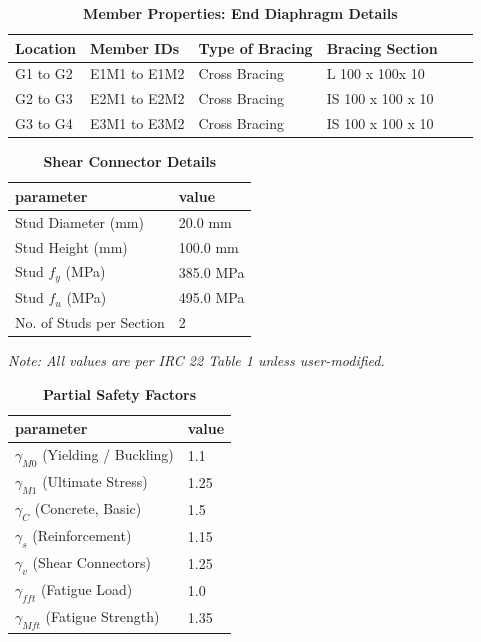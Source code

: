 \documentclass[12pt,a4paper]{report}
\numberwithin{table}{chapter}
\numberwithin{figure}{chapter}
\begin{document}
\begin{longtable}{|L{2.2cm}|L{2.2cm}|L{3.0cm}|L{2.5cm}|C{1.8cm}|C{1.8cm}|}
\caption{\textbf{Member Properties: End Diaphragm Details}}
\hline
\textbf{Location} & \textbf{Member IDs} & \textbf{Type of Bracing} & \textbf{Bracing Section} \\
\hline
G1 to G2 & E1M1 to E1M2 & Cross Bracing & L 100 x 100x 10 \\[6pt]
\hline
G2 to G3 & E2M1 to E2M2 & Cross Bracing & IS 100 x 100 x 10 \\[6pt]
\hline
G3 to G4 & E3M1 to E3M2 & Cross Bracing & IS 100 x 100 x 10 \\[6pt]
\hline
\end{longtable}



\label{subsec:shear-connectors}

\vspace{2.2em}

\vspace{0.4em}
\begin{longtable}{|L{5.5cm}|p{10.0cm}|}
\caption{\textbf{Shear Connector Details}}
\hline
\textbf{parameter} & \textbf{value} \\
\hline
\textnormal{Stud Diameter (mm)} & 20.0 mm \\[6pt]
\hline
\textnormal{Stud Height (mm)} & 100.0 mm \\[6pt]
\hline
\textnormal{Stud $f_y$ (MPa)} & 385.0 MPa \\[6pt]
\hline
\textnormal{Stud $f_u$ (MPa)} & 495.0 MPa \\[6pt]
\hline
\textnormal{No. of Studs per Section} & 2 \\[6pt]
\hline
\end{longtable}



\label{subsec:safety-factors}

\vspace{2.2em}

\vspace{0.3em}
\noindent\textit{Note: All values are per IRC 22 Table 1 unless user-modified.}

\vspace{0.4em}
\begin{longtable}{|L{5.5cm}|p{10.0cm}|}
\caption{\textbf{Partial Safety Factors}}
\hline
\textbf{parameter} & \textbf{value} \\
\hline
\textnormal{$\gamma_{M0}$ (Yielding / Buckling)} & 1.1 \\[6pt]
\hline
\textnormal{$\gamma_{M1}$ (Ultimate Stress)} & 1.25 \\[6pt]
\hline
\textnormal{$\gamma_C$ (Concrete, Basic)} & 1.5 \\[6pt]
\hline
\textnormal{$\gamma_s$ (Reinforcement)} & 1.15 \\[6pt]
\hline
\textnormal{$\gamma_v$ (Shear Connectors)} & 1.25 \\[6pt]
\hline
\textnormal{$\gamma_{fft}$ (Fatigue Load)} & 1.0 \\[6pt]
\hline
\textnormal{$\gamma_{Mft}$ (Fatigue Strength)} & 1.35 \\[6pt]
\hline
\end{longtable}
\end{document}
